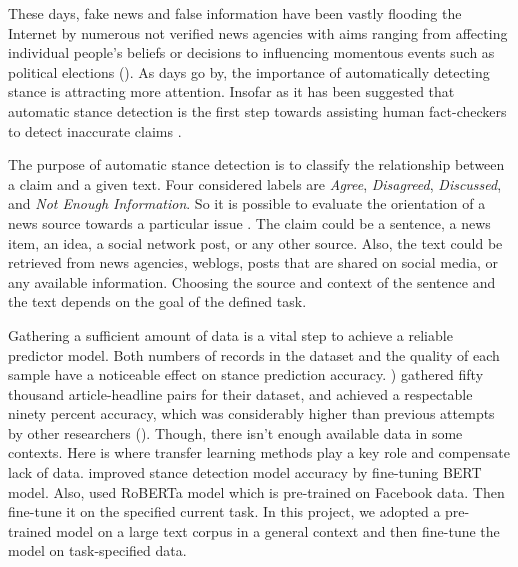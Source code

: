 These days, fake news and false information have been vastly flooding the Internet by numerous not verified news agencies with aims ranging from affecting individual people’s beliefs or decisions to influencing momentous events such as political elections (\cite{memory_network}). As days go by, the importance of automatically detecting stance is attracting more attention. Insofar as it has been suggested that automatic stance detection is the first step towards assisting human fact-checkers to detect inaccurate claims \cite{UCLMR}.



The purpose of automatic stance detection is to classify the relationship between a claim and a given text. Four considered labels are \textit{Agree}, \textit{Disagreed}, \textit{Discussed}, and \textit{Not Enough Information}. So it is possible to evaluate the orientation of a news source towards a particular issue \cite{UCLMR}. The claim could be a sentence, a news item, an idea, a social network post, or any other source. Also, the text could be retrieved from news agencies, weblogs, posts that are shared on social media, or any available information. Choosing the source and context of the sentence and the text depends on the goal of the defined task. 

Gathering a sufficient amount of data is a vital step to achieve a reliable predictor model. Both numbers of records in the dataset and the quality of each sample have a noticeable effect on stance prediction accuracy. \cite{takestancefake}) gathered fifty thousand article-headline pairs for their dataset, and achieved a respectable ninety percent accuracy, which was considerably higher than previous attempts by other researchers (\cite{book_fake}). Though, there isn't enough available data in some contexts. Here is where transfer learning methods play a key role and compensate lack of data. \cite{stance_robust} improved stance detection model accuracy by fine-tuning BERT model.
Also, \cite{takestancefake} used RoBERTa model which is pre-trained on Facebook data. Then fine-tune it on the specified current task. In this project, we adopted a pre-trained model on a large text corpus in a general context and then fine-tune the model on task-specified data.

